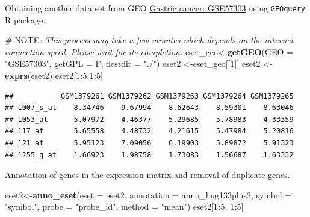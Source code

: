 \documentclass[
  12pt,
]{book}
\newenvironment{Shaded}{\begin{snugshade}}{\end{snugshade}}
\newcommand{\AlertTok}[1]{\textcolor[rgb]{0.94,0.16,0.16}{#1}}
\newcommand{\AttributeTok}[1]{\textcolor[rgb]{0.13,0.29,0.53}{#1}}
\newcommand{\CommentTok}[1]{\textcolor[rgb]{0.56,0.35,0.01}{\textit{#1}}}
\newcommand{\DecValTok}[1]{\textcolor[rgb]{0.00,0.00,0.81}{#1}}
\newcommand{\FunctionTok}[1]{\textcolor[rgb]{0.13,0.29,0.53}{\textbf{#1}}}
\newcommand{\NormalTok}[1]{#1}
\newcommand{\OtherTok}[1]{\textcolor[rgb]{0.56,0.35,0.01}{#1}}
\newcommand{\SpecialCharTok}[1]{\textcolor[rgb]{0.81,0.36,0.00}{\textbf{#1}}}
\newcommand{\StringTok}[1]{\textcolor[rgb]{0.31,0.60,0.02}{#1}}
\begin{document}
Obtaining another data set from GEO \href{https://www.ncbi.nlm.nih.gov/pubmed/24935174/}{Gastric cancer: GSE57303} using \texttt{GEOquery} R package.

\begin{Shaded}
\begin{Highlighting}[]
\CommentTok{\# }\AlertTok{NOTE}\CommentTok{: This process may take a few minutes which depends on the internet connection speed. Please wait for its completion.}
\NormalTok{eset\_geo}\OtherTok{\textless{}{-}}\FunctionTok{getGEO}\NormalTok{(}\AttributeTok{GEO     =} \StringTok{"GSE57303"}\NormalTok{, }\AttributeTok{getGPL  =}\NormalTok{ F, }\AttributeTok{destdir =} \StringTok{"./"}\NormalTok{)}
\NormalTok{eset2    }\OtherTok{\textless{}{-}}\NormalTok{eset\_geo[[}\DecValTok{1}\NormalTok{]]}
\NormalTok{eset2    }\OtherTok{\textless{}{-}}\FunctionTok{exprs}\NormalTok{(eset2)}
\NormalTok{eset2[}\DecValTok{1}\SpecialCharTok{:}\DecValTok{5}\NormalTok{,}\DecValTok{1}\SpecialCharTok{:}\DecValTok{5}\NormalTok{]}
\end{Highlighting}
\end{Shaded}

\begin{verbatim}
##           GSM1379261 GSM1379262 GSM1379263 GSM1379264 GSM1379265
## 1007_s_at    8.34746    9.67994    8.62643    8.59301    8.63046
## 1053_at      5.07972    4.46377    5.29685    5.78983    4.33359
## 117_at       5.65558    4.48732    4.21615    5.47984    5.20816
## 121_at       5.95123    7.09056    6.19903    5.89872    5.91323
## 1255_g_at    1.66923    1.98758    1.73083    1.56687    1.63332
\end{verbatim}

Annotation of genes in the expression matrix and removal of duplicate genes.

\begin{Shaded}
\begin{Highlighting}[]
\NormalTok{eset2}\OtherTok{\textless{}{-}}\FunctionTok{anno\_eset}\NormalTok{(}\AttributeTok{eset       =}\NormalTok{ eset2,}
                 \AttributeTok{annotation =}\NormalTok{ anno\_hug133plus2,}
                 \AttributeTok{symbol     =} \StringTok{"symbol"}\NormalTok{,}
                 \AttributeTok{probe      =} \StringTok{"probe\_id"}\NormalTok{,}
                 \AttributeTok{method     =} \StringTok{"mean"}\NormalTok{)}
\NormalTok{eset2[}\DecValTok{1}\SpecialCharTok{:}\DecValTok{5}\NormalTok{, }\DecValTok{1}\SpecialCharTok{:}\DecValTok{5}\NormalTok{]}
\end{Highlighting}
\end{Shaded}
\end{document}
